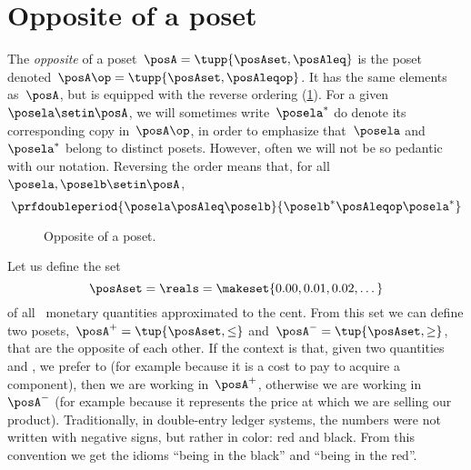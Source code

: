 
\section{Opposite of a poset}\label{sec:opposite-of-a-poset}

\begin{definition}
    \label{def:poset-opposite}
    The \emph{opposite} of a poset~$\posA=\tupp{\posAset, \posAleq}$ is the poset denoted~$\posA\op=\tupp{\posAset, \posAleqop}$.
    It has the same elements as~$\posA$, but is equipped with the reverse ordering (\cref{fig:poset-opposite}).
    For a given~$\posela \setin \posA$, we will sometimes write~$\posela^*$ do denote its corresponding copy in~$\posA\op$, in order to emphasize that~$\posela$ and~$\posela^*$ belong to distinct posets.
    However, often we will not be so pedantic with our notation.
    Reversing the order means that, for all~$\posela,\poselb \setin \posA$,
    \begin{equation}
        \prfdoubleperiod{
            \posela \posAleq \poselb
        }{
            \poselb^* \posAleqop \posela^*
        }
    \end{equation}
\end{definition}

\begin{figure}[tbh]
    \centering
    \caption{
        Opposite of a poset.
    }
    \label{fig:poset-opposite}
\end{figure}

\begin{example}
    Let us define the set
    \begin{equation}
        \posAset=\reals=\makeset{0.00,0.01,0.02,\dots}
    \end{equation}
    of all \CHFneutral \ monetary quantities approximated to the cent.
    From this set we can define two posets,~$\posA^{+} = \tup{\posAset, \leq}$ and~$\posA^{-} = \tup{\posAset, \geq}$, that are the opposite of each other.
    If the context is that, given two quantities \unit[1]{\CHFneutral} and \unit[2]{\CHFneutral}, we prefer \unit[1]{\CHFneutral} to \unit[2]{\CHFneutral} (for example because it is a cost to pay to acquire a component), then we are working in~$\posA^{+}$, otherwise we are working in~$\posA^{-}$ (for example because it represents the price at which we are selling our product).
    Traditionally, in double-entry ledger systems, the numbers were not written with negative signs, but rather in color: red and black.
    From this convention we get the idioms ``being in the black'' and ``being in the red''.
\end{example}
